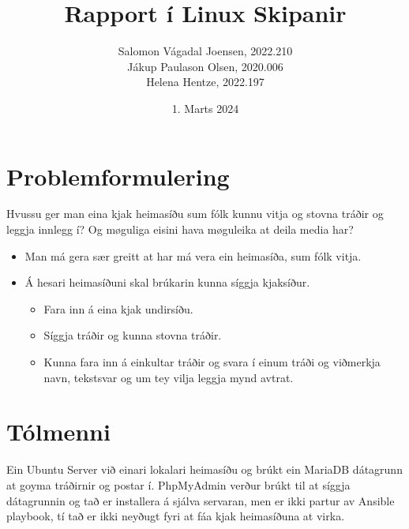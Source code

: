 \documentclass{article}
\title{Rapport í Linux Skipanir}
\author{Salomon Vágadal Joensen, 2022.210\\Jákup Paulason Olsen, 2020.006\\Helena Hentze, 2022.197}
\date{1. Marts 2024}
\begin{document}



\section{Problemformulering}
\par Hvussu ger man eina kjak heimasíðu sum fólk kunnu vitja og stovna tráðir og leggja innlegg í? Og møguliga eisini hava møguleika at deila media har? 
\begin{itemize}
    \item Man má gera sær greitt at har má vera ein heimasíða, sum fólk vitja.
    \item Á hesari heimasíðuni skal brúkarin kunna síggja kjaksíður.
    \begin{itemize}
        \item Fara inn á eina kjak undirsíðu.
        \item Síggja tráðir og kunna stovna tráðir.
        \item Kunna fara inn á einkultar tráðir og svara í einum tráði og viðmerkja navn, tekstsvar og um tey vilja leggja mynd avtrat. 
    \end{itemize}
\end{itemize} 

\section{Tólmenni}
\par Ein Ubuntu Server við einari lokalari heimasíðu og brúkt ein MariaDB dátagrunn
at goyma tráðirnir og postar í.
PhpMyAdmin verður brúkt til at síggja dátagrunnin og tað er installera á sjálva servaran,
men er ikki partur av Ansible playbook, tí tað er ikki neyðugt fyri at fáa kjak heimasíðuna
at virka.
\end{document}
